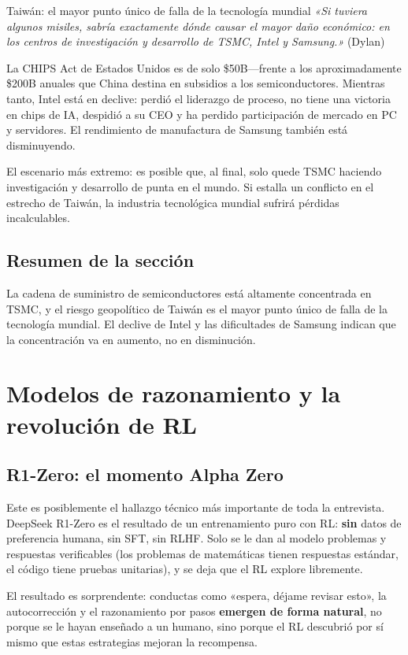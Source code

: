 \documentclass[a4paper]{article}
\begin{document}
\begin{warningbox}{Taiwán: el mayor punto único de falla de la tecnología mundial}
\textit{«Si tuviera algunos misiles, sabría exactamente dónde causar el mayor daño económico: en los centros de investigación y desarrollo de TSMC, Intel y Samsung.»} (Dylan)

La CHIPS Act de Estados Unidos es de solo \$50B---frente a los aproximadamente \$200B anuales que China destina en subsidios a los semiconductores. Mientras tanto, Intel está en declive: perdió el liderazgo de proceso, no tiene una victoria en chips de IA, despidió a su CEO y ha perdido participación de mercado en PC y servidores. El rendimiento de manufactura de Samsung también está disminuyendo.

El escenario más extremo: es posible que, al final, solo quede TSMC haciendo investigación y desarrollo de punta en el mundo. Si estalla un conflicto en el estrecho de Taiwán, la industria tecnológica mundial sufrirá pérdidas incalculables.
\end{warningbox}

\subsection{Resumen de la sección}

La cadena de suministro de semiconductores está altamente concentrada en TSMC, y el riesgo geopolítico de Taiwán es el mayor punto único de falla de la tecnología mundial. El declive de Intel y las dificultades de Samsung indican que la concentración va en aumento, no en disminución.
\section{Modelos de razonamiento y la revolución de RL}

\subsection{R1-Zero: el momento Alpha Zero}

Este es posiblemente el hallazgo técnico más importante de toda la entrevista. DeepSeek R1-Zero es el resultado de un entrenamiento puro con RL: \textbf{sin} datos de preferencia humana, sin SFT, sin RLHF. Solo se le dan al modelo problemas y respuestas verificables (los problemas de matemáticas tienen respuestas estándar, el código tiene pruebas unitarias), y se deja que el RL explore libremente.

El resultado es sorprendente: conductas como «espera, déjame revisar esto», la autocorrección y el razonamiento por pasos \textbf{emergen de forma natural}, no porque se le hayan enseñado a un humano, sino porque el RL descubrió por sí mismo que estas estrategias mejoran la recompensa.
\end{document}
